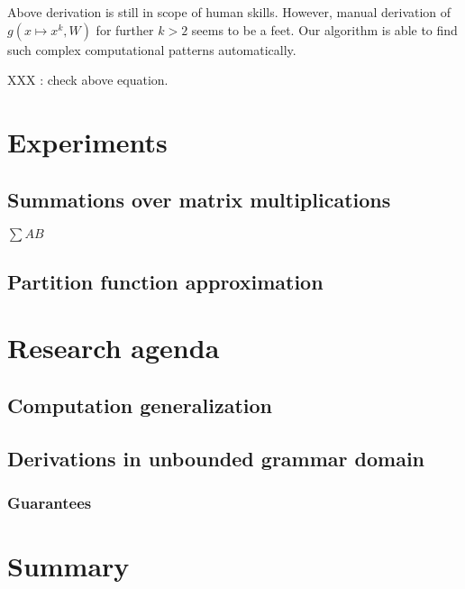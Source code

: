 \documentclass{article}
\begin{document}
Above derivation is still in scope of human skills. However, manual derivation of $g(x \mapsto x^k, W)$ for further $k > 2$  
seems to be a feet. Our algorithm is able to find such complex computational patterns automatically.

XXX : check above equation.

\section{Experiments}

\subsection{Summations over matrix multiplications}

$\sum AB$

\subsection{Partition function approximation}

\section{Research agenda}

\subsection{Computation generalization}

\subsection{Derivations in unbounded grammar domain}

\subsubsection{Guarantees}

\section{Summary}



\end{document}
